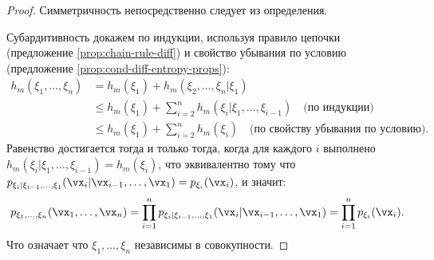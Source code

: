 \begin{proof}
	Симметричность непосредственно следует из определения.
		
	Субардитивность докажем по индукции, используя правило цепочки (предложение \ref{prop:chain-rule-diff}) и свойство убывания по условию (предложение \ref{prop:cond-diff-entropy-props}):
			\begin{align*}
				h_m(\xi_1, \ldots, \xi_n) &= h_m(\xi_1) + h_m(\xi_2, \ldots, \xi_n | \xi_1) \\
				&\leq h_m(\xi_1) + \sum_{i=2}^n h_m(\xi_i | \xi_1, \ldots, \xi_{i-1}) \quad \text{(по индукции)} \\
				&\leq h_m(\xi_1) + \sum_{i=2}^n h_m(\xi_i) \quad \text{(по свойству убывания по условию)}.
			\end{align*}
			Равенство достигается тогда и только тогда, когда для каждого $i$ выполнено $h_m(\xi_i | \xi_1, \ldots, \xi_{i-1}) = h_m(\xi_i)$, что эквивалентно тому что $p_{\xi_i | \xi_{i - 1}, \ldots, \xi_{1}}(\vx_i | \vx_{i - 1}, \ldots, \vx_{1}) = p_{\xi_i}(\vx_i)$, и значит:
			\[
				p_{\xi_1, \ldots, \xi_n}(\vx_1, \ldots, \vx_n) = \prod_{i = 1}^{n} p_{\xi_i | \xi_{i - 1}, \ldots, \xi_{1}}(\vx_i | \vx_{i - 1}, \ldots, \vx_{1}) = \prod_{i = 1}^{n} p_{\xi_i}(\vx_i).
			\]
			Что означает что $\xi_1, \ldots, \xi_n$ независимы в совокупности.
\end{proof}


